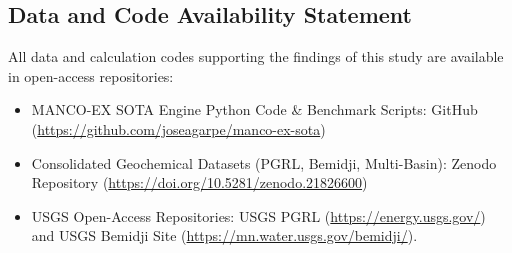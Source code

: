 \documentclass[review,12pt]{elsarticle}
\begin{document}
\subsection{Data and Code Availability Statement}
All data and calculation codes supporting the findings of this study are available in open-access repositories:
\begin{itemize}
    \item MANCO-EX SOTA Engine Python Code \& Benchmark Scripts: GitHub (\url{https://github.com/joseagarpe/manco-ex-sota})
    \item Consolidated Geochemical Datasets (PGRL, Bemidji, Multi-Basin): Zenodo Repository (\url{https://doi.org/10.5281/zenodo.21826600})
    \item USGS Open-Access Repositories: USGS PGRL (\url{https://energy.usgs.gov/}) and USGS Bemidji Site (\url{https://mn.water.usgs.gov/bemidji/}).
\end{itemize}
\end{document}
